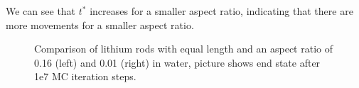 We can see that $t^*$ increases for a smaller aspect ratio, indicating that there are more movements for a smaller aspect ratio. 
\begin{figure}[h]
  \begin{minipage}[t]{0.45\textwidth}
  \end{minipage}
  \hfill
  \begin{minipage}[t]{0.45\textwidth}
  \end{minipage}
  \caption{Comparison of lithium rods with equal length and an aspect ratio of 0.16 (left) and 0.01 (right) in water, picture shows end state after 1e7 MC iteration steps.}
  \label{fig:asp_length}
\end{figure}
